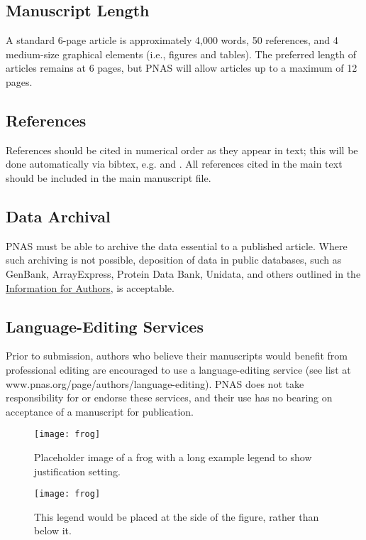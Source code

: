 \documentclass[9pt,twocolumn,twoside,lineno]{pnas-new}
\begin{document}
\subsection*{Manuscript Length}

A standard 6-page article is approximately 4,000 words, 50 references, and 4 medium-size graphical elements (i.e., figures and tables). The preferred length of articles remains at 6 pages, but PNAS will allow articles up to a maximum of 12 pages.

\subsection*{References}

References should be cited in numerical order as they appear in text; this will be done automatically via bibtex, e.g. \cite{belkin2002using} and \cite{berard1994embedding,coifman2005geometric}. All references cited in the main text should be included in the main manuscript file.

\subsection*{Data Archival}

PNAS must be able to archive the data essential to a published article. Where such archiving is not possible, deposition of data in public databases, such as GenBank, ArrayExpress, Protein Data Bank, Unidata, and others outlined in the \href{https://www.pnas.org/page/authors/journal-policies#xi}{Information for Authors}, is acceptable.

\subsection*{Language-Editing Services}
Prior to submission, authors who believe their manuscripts would benefit from professional editing are encouraged to use a language-editing service (see list at www.pnas.org/page/authors/language-editing). PNAS does not take responsibility for or endorse these services, and their use has no bearing on acceptance of a manuscript for publication. 

\begin{figure}%
\centering
\texttt{[image: frog]}
\caption{Placeholder image of a frog with a long example legend to show justification setting.}
\label{fig:frog}
\end{figure}


\begin{SCfigure*}[\sidecaptionrelwidth][t]
\centering
\texttt{[image: frog]}
\caption{This legend would be placed at the side of the figure, rather than below it.}\label{fig:side}
\end{SCfigure*}
\end{document}
